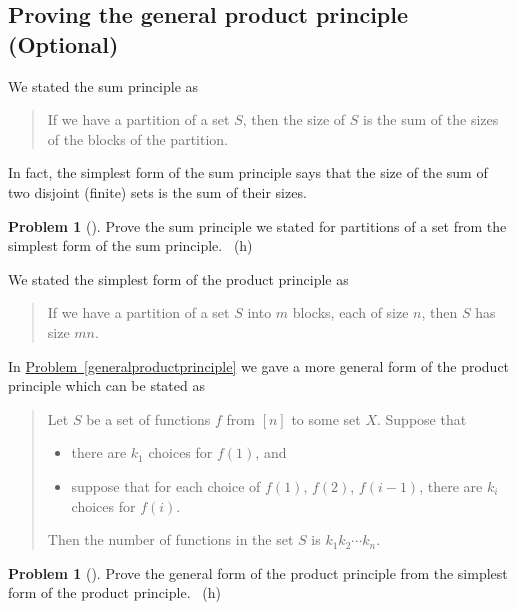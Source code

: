 \documentclass[10pt,]{book}
\theoremstyle{plain}
\theoremstyle{definition}
\newtheorem{activity}[project]{Problem}
\theoremstyle{definition}
\numberwithin{equation}{chapter}
\begin{document}
\subsection[{Proving the general product principle (Optional)}]{Proving the general product principle (Optional)}\label{subsection-14}
\hypertarget{p-475}{}%
We stated the sum principle as%
\begin{quote}\hypertarget{blockquote-11}{}
\hypertarget{p-476}{}%
If we have a partition of a set \(S\), then the size of \(S\) is the sum of the sizes of the blocks of the partition.%
\end{quote}
\hypertarget{p-477}{}%
In fact, the simplest form of the sum principle says that the size of the sum of two disjoint (finite) sets is the sum of their sizes.%
\begin{activity}[]\marginsymbol[-1em]{} \label{activity-79}
\hypertarget{p-478}{}%
Prove the sum principle we stated for partitions of a set from the simplest form of the sum principle.%
~{\tiny (h)}\end{activity}
\hypertarget{p-482}{}%
We stated the simplest form of the product principle as%
\begin{quote}\hypertarget{blockquote-12}{}
\hypertarget{p-483}{}%
If we have a partition of a set \(S\) into \(m\) blocks, each of size \(n\), then \(S\) has size \(mn\).%
\end{quote}
\hypertarget{p-484}{}%
In \hyperref[generalproductprinciple]{Problem~\ref{generalproductprinciple}} we gave a more general form of the product principle which can be stated as %
\begin{quote}\hypertarget{blockquote-13}{}
\hypertarget{p-485}{}%
Let \(S\) be a set of functions \(f\) from \([n]\) to some set \(X\).  Suppose that \leavevmode%
\begin{itemize}[label=\textbullet]
\item{}\hypertarget{p-486}{}%
there are \(k_1\) choices for \(f(1)\), and%
\item{}\hypertarget{p-487}{}%
suppose that for each choice of \(f(1)\), \(f(2)\), \textellipsis{} \(f(i-1)\), there are \(k_i\) choices for \(f(i)\).%
\end{itemize}
 Then the number of functions in the set \(S\) is \(k_1k_2\cdots k_n\).%
\end{quote}
\begin{activity}[] \label{generalproductprincipleproof}
\hypertarget{p-488}{}%
Prove the general form of the product principle from the simplest form of the product principle.%
~{\tiny (h)}\end{activity}
\typeout{************************************************}
\typeout{************************************************}
\end{document}
